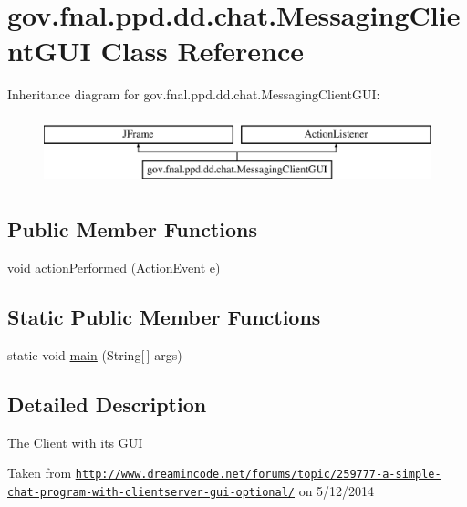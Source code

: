 \hypertarget{classgov_1_1fnal_1_1ppd_1_1dd_1_1chat_1_1MessagingClientGUI}{\section{gov.\-fnal.\-ppd.\-dd.\-chat.\-Messaging\-Client\-G\-U\-I Class Reference}
\label{classgov_1_1fnal_1_1ppd_1_1dd_1_1chat_1_1MessagingClientGUI}
}
Inheritance diagram for gov.\-fnal.\-ppd.\-dd.\-chat.\-Messaging\-Client\-G\-U\-I\-:\begin{figure}[H]
\begin{center}
\leavevmode
\includegraphics[height=2.000000cm]{classgov_1_1fnal_1_1ppd_1_1dd_1_1chat_1_1MessagingClientGUI}
\end{center}
\end{figure}
\subsection*{Public Member Functions}
\begin{DoxyCompactItemize}
\item 
void \hyperlink{classgov_1_1fnal_1_1ppd_1_1dd_1_1chat_1_1MessagingClientGUI_a5b1a28bbc7f3f3bcdd00cc219a4a6486}{action\-Performed} (Action\-Event e)
\end{DoxyCompactItemize}
\subsection*{Static Public Member Functions}
\begin{DoxyCompactItemize}
\item 
static void \hyperlink{classgov_1_1fnal_1_1ppd_1_1dd_1_1chat_1_1MessagingClientGUI_ac6a16db13da46b43cdbffbf7437f90bc}{main} (String\mbox{[}$\,$\mbox{]} args)
\end{DoxyCompactItemize}


\subsection{Detailed Description}
The Client with its G\-U\-I

Taken from \href{http://www.dreamincode.net/forums/topic/259777-a-simple-chat-program-with-clientserver-gui-optional/}{\tt http\-://www.\-dreamincode.\-net/forums/topic/259777-\/a-\/simple-\/chat-\/program-\/with-\/clientserver-\/gui-\/optional/} on 5/12/2014 


